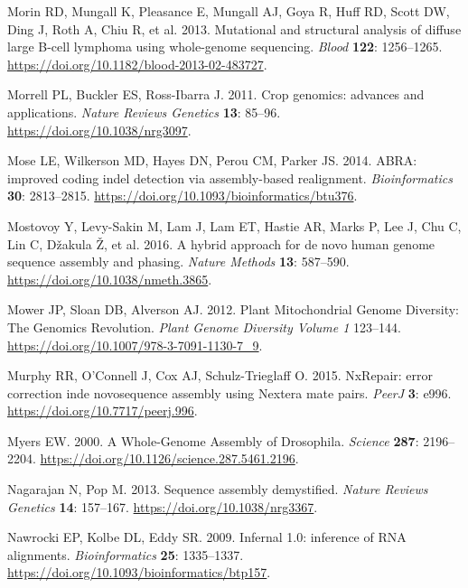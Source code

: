 \documentclass[
  12pt,
  oneside,
  openany]{book}
\begin{document}
\leavevmode\hypertarget{ref-Morin_2013}{}%
Morin RD, Mungall K, Pleasance E, Mungall AJ, Goya R, Huff RD, Scott DW, Ding J, Roth A, Chiu R, et al. 2013. Mutational and structural analysis of diffuse large B-cell lymphoma using whole-genome sequencing. \emph{Blood} \textbf{122}: 1256--1265. \url{https://doi.org/10.1182/blood-2013-02-483727}.

\leavevmode\hypertarget{ref-Morrell_2011}{}%
Morrell PL, Buckler ES, Ross-Ibarra J. 2011. Crop genomics: advances and applications. \emph{Nature Reviews Genetics} \textbf{13}: 85--96. \url{https://doi.org/10.1038/nrg3097}.

\leavevmode\hypertarget{ref-Mose_2014}{}%
Mose LE, Wilkerson MD, Hayes DN, Perou CM, Parker JS. 2014. ABRA: improved coding indel detection via assembly-based realignment. \emph{Bioinformatics} \textbf{30}: 2813--2815. \url{https://doi.org/10.1093/bioinformatics/btu376}.

\leavevmode\hypertarget{ref-Mostovoy_2016}{}%
Mostovoy Y, Levy-Sakin M, Lam J, Lam ET, Hastie AR, Marks P, Lee J, Chu C, Lin C, Džakula Ž, et al. 2016. A hybrid approach for de novo human genome sequence assembly and phasing. \emph{Nature Methods} \textbf{13}: 587--590. \url{https://doi.org/10.1038/nmeth.3865}.

\leavevmode\hypertarget{ref-Mower_2012}{}%
Mower JP, Sloan DB, Alverson AJ. 2012. Plant Mitochondrial Genome Diversity: The Genomics Revolution. \emph{Plant Genome Diversity Volume 1} 123--144. \url{https://doi.org/10.1007/978-3-7091-1130-7_9}.

\leavevmode\hypertarget{ref-Murphy_2015}{}%
Murphy RR, O'Connell J, Cox AJ, Schulz-Trieglaff O. 2015. NxRepair: error correction inde novosequence assembly using Nextera mate pairs. \emph{PeerJ} \textbf{3}: e996. \url{https://doi.org/10.7717/peerj.996}.

\leavevmode\hypertarget{ref-Myers_2000}{}%
Myers EW. 2000. A Whole-Genome Assembly of Drosophila. \emph{Science} \textbf{287}: 2196--2204. \url{https://doi.org/10.1126/science.287.5461.2196}.

\leavevmode\hypertarget{ref-Nagarajan_2013}{}%
Nagarajan N, Pop M. 2013. Sequence assembly demystified. \emph{Nature Reviews Genetics} \textbf{14}: 157--167. \url{https://doi.org/10.1038/nrg3367}.

\leavevmode\hypertarget{ref-Nawrocki_2009}{}%
Nawrocki EP, Kolbe DL, Eddy SR. 2009. Infernal 1.0: inference of RNA alignments. \emph{Bioinformatics} \textbf{25}: 1335--1337. \url{https://doi.org/10.1093/bioinformatics/btp157}.
\end{document}
